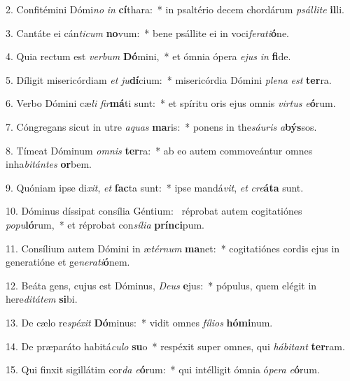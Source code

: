 2. Confitémini Dómi\textit{no} \textit{in} \textbf{cí}thara:~*  in psaltério decem chordárum \textit{psál}\textit{li}\textit{te} \textbf{il}li.\

3. Cantáte ei cán\textit{ti}\textit{cum} \textbf{no}vum:~*  bene psállite ei in voci\textit{fe}\textit{ra}\textit{ti}\textbf{ó}ne.\

4. Quia rectum est \textit{ver}\textit{bum} \textbf{Dó}mini,~*  et ómnia ópera \textit{e}\textit{jus} \textit{in} \textbf{fi}de.\

5. Díligit misericórdiam \textit{et} \textit{ju}\textbf{dí}cium:~*  misericórdia Dómini \textit{ple}\textit{na} \textit{est} \textbf{ter}ra.\

6. Verbo Dómini cæ\textit{li} \textit{fir}\textbf{má}ti sunt:~*  et spíritu oris ejus omnis \textit{vir}\textit{tus} \textit{e}\textbf{ó}rum.\

7. Cóngregans sicut in utre \textit{a}\textit{quas} \textbf{ma}ris:~*  ponens in the\textit{sáu}\textit{ris} \textit{a}\textbf{býs}sos.\

8. Tímeat Dóminum \textit{om}\textit{nis} \textbf{ter}ra:~*  ab eo autem commoveántur omnes inha\textit{bi}\textit{tán}\textit{tes} \textbf{or}bem.\

9. Quóniam ipse di\textit{xit}, \textit{et} \textbf{fac}ta sunt:~*  ipse mandá\textit{vit}, \textit{et} \textit{cre}\textbf{á}\textbf{ta} sunt.\

10. Dóminus díssipat consília Géntium: \dag\  réprobat autem cogitatiónes \textit{po}\textit{pu}\textbf{ló}rum,~*  et réprobat con\textit{sí}\textit{li}\textit{a} \textbf{prín}\textbf{ci}pum.\

11. Consílium autem Dómini in æ\textit{tér}\textit{num} \textbf{ma}net:~*  cogitatiónes cordis ejus in generatióne et ge\textit{ne}\textit{ra}\textit{ti}\textbf{ó}nem.\

12. Beáta gens, cujus est Dóminus, \textit{De}\textit{us} \textbf{e}jus:~*  pópulus, quem elégit in here\textit{di}\textit{tá}\textit{tem} \textbf{si}bi.\

13. De cælo re\textit{spé}\textit{xit} \textbf{Dó}minus:~*  vidit omnes \textit{fí}\textit{li}\textit{os} \textbf{hó}\textbf{mi}num.\

14. De præparáto habitá\textit{cu}\textit{lo} \textbf{su}o~*  respéxit super omnes, qui \textit{há}\textit{bi}\textit{tant} \textbf{ter}ram.\

15. Qui finxit sigillátim cor\textit{da} \textit{e}\textbf{ó}rum:~*  qui intélligit ómnia ó\textit{pe}\textit{ra} \textit{e}\textbf{ó}rum.\


